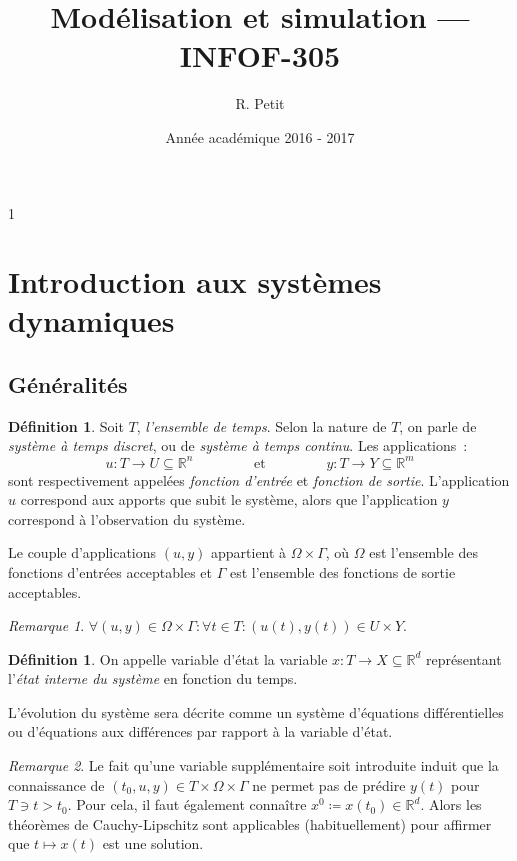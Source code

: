 \documentclass{article}
\title{Modélisation et simulation --- INFOF-305}
\author{R. Petit}
\date{Année académique 2016 - 2017}
\theoremstyle{definition}
\newtheorem{déf}[thm]{Définition}
\theoremstyle{remark}
\newtheorem*{rmq}{Remarque}
\newcommand{\R}{\mathbb R}
\begin{document}
\maketitle
\tableofcontents
\newpage
{}
\setcounter{page}1

\section{Introduction aux systèmes dynamiques}
	\subsection{Généralités}

	\begin{déf} Soit $T$, \textit{l'ensemble de temps}. Selon la nature de $T$, on parle de \textit{système à temps discret}, ou de \textit{système à temps
	continu}. Les applications~:
	\[u : T \to U \subseteq \R^n \qquad\qquad \text{ et } \qquad\qquad y : T \to Y \subseteq \R^m\]
	sont respectivement appelées \textit{fonction d'entrée} et \textit{fonction de sortie}. L'application $u$ correspond aux apports que subit le système, alors
	que l'application $y$ correspond à l'observation du système.

	Le couple d'applications $(u, y)$ appartient à $\Omega \times \Gamma$, où $\Omega$ est l'ensemble des fonctions d'entrées acceptables et $\Gamma$ est
	l'ensemble des fonctions de sortie acceptables.
	\end{déf}

	\begin{rmq} $\forall (u, y) \in \Omega \times \Gamma : \forall t \in T : \left(u(t), y(t)\right) \in U \times Y$.
	\end{rmq}

	\begin{déf} On appelle variable d'état la variable $x : T \to X \subseteq \R^d$ représentant l'\textit{état interne du système} en fonction du temps.

	L'évolution du système sera décrite comme un système d'équations différentielles ou d'équations aux différences par rapport à la variable d'état.
	\end{déf}

	\begin{rmq} Le fait qu'une variable supplémentaire soit introduite induit que la connaissance de $(t_0, u, y) \in T \times \Omega \times \Gamma$ ne permet
	pas de prédire $y(t)$ pour $T \ni t > t_0$. Pour cela, il faut également connaître $x^0 \coloneqq x(t_0) \in \R^d$. Alors les théorèmes de Cauchy-Lipschitz
	sont applicables (habituellement) pour affirmer que $t \mapsto x(t)$ est une solution.
	\end{rmq}
\end{document}
